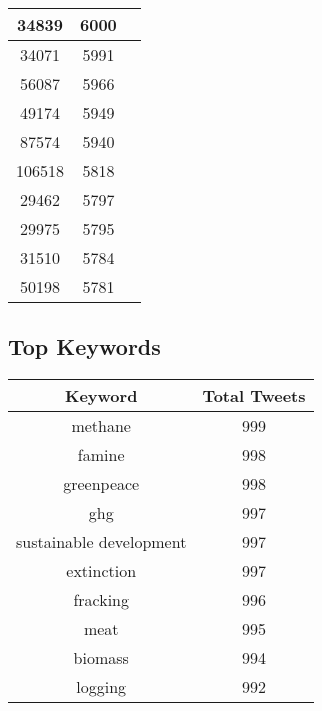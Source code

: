 \documentclass{article}\usepackage[T1]{fontenc}
\begin{document}
\begin{tabular}{|c|c|c|}
 \hline
34839 & 6000\\ 
 \hline
34071 & 5991\\ 
 \hline
56087 & 5966\\ 
 \hline
49174 & 5949\\ 
 \hline
87574 & 5940\\ 
 \hline
106518 & 5818\\ 
 \hline
29462 & 5797\\ 
 \hline
29975 & 5795\\ 
 \hline
31510 & 5784\\ 
 \hline
50198 & 5781\\ 
 \hline
\end{tabular}\subsection*{Top Keywords}\begin{tabular}{|c|c|}         \hline         Keyword & Total Tweets \\ 
 \hline
methane & 999\\ 
 \hline
famine & 998\\ 
 \hline
greenpeace & 998\\ 
 \hline
ghg & 997\\ 
 \hline
sustainable development & 997\\ 
 \hline
extinction & 997\\ 
 \hline
fracking & 996\\ 
 \hline
meat & 995\\ 
 \hline
biomass & 994\\ 
 \hline
logging & 992\\ 
 \hline
\end{tabular}
\end{document}
